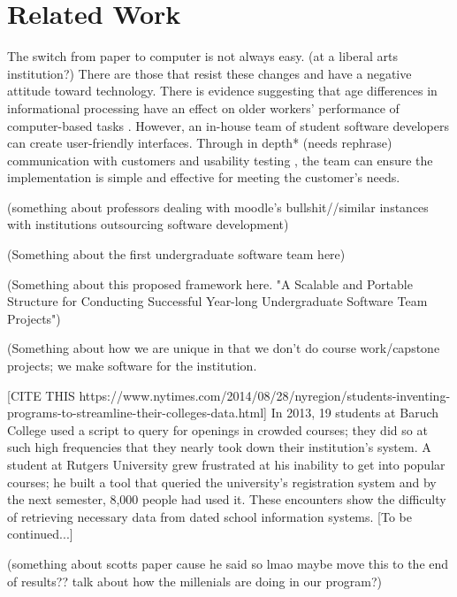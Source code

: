 \section{Related Work}

The switch from paper to computer is not always easy. (at a liberal arts institution?) There are those that resist these changes and have a negative attitude toward technology. There is evidence suggesting that age differences in informational processing have an effect on older workers' performance of computer-based tasks \cite{oldpeopleandtech}. 
However, an in-house team of student software developers can create user-friendly interfaces. Through in depth* (needs rephrase) communication with customers and usability testing \cite{usabilitytesting}, the team can ensure the implementation is simple and effective for meeting the customer's needs.

(something about professors dealing with moodle's bullshit//similar instances with institutions outsourcing software development)

(Something about the first undergraduate software team here)\cite{rochesterfirstundergradsoftwareteam}

(Something about this proposed framework here. "A Scalable and Portable Structure for Conducting Successful Year-long Undergraduate Software Team Projects") \cite{yearlong}

(Something about how we are unique in that we don't do course work/capstone projects; we make software for the institution.

[CITE THIS https://www.nytimes.com/2014/08/28/nyregion/students-inventing-programs-to-streamline-their-colleges-data.html] 
In 2013, 19 students at Baruch College used a script to query for openings in crowded courses; they did so at such high frequencies that they nearly took down their institution's system. A student at Rutgers University grew frustrated at his inability to get into popular courses; he built a tool that queried the university's registration system and by the next semester, 8,000 people had used it. These encounters show the difficulty of retrieving necessary data from dated school information systems. 
[To be continued...]


(something about scotts paper cause he said so lmao maybe move this to the end of results?? talk about how the millenials are doing in our program?) \cite{heggen2018hiring}